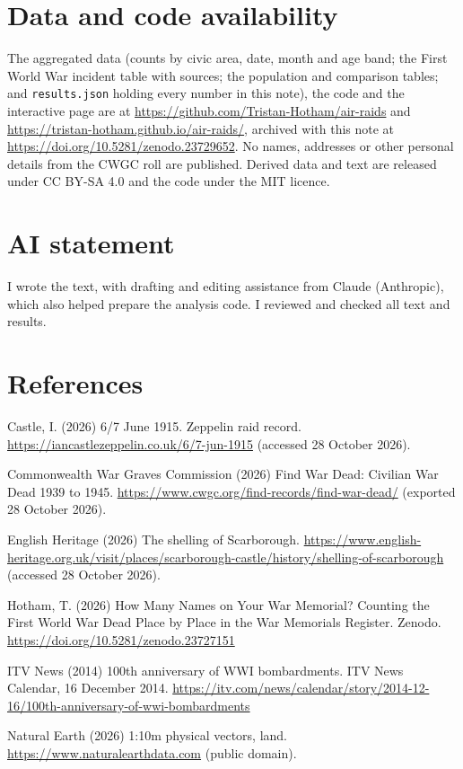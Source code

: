 \documentclass[11pt,a4paper]{article}
\begin{document}
\section*{Data and code availability}

The aggregated data (counts by civic area, date, month and age band; the First World War incident table with sources; the population and comparison tables; and \texttt{results.json} holding every number in this note), the code and the interactive page are at \url{https://github.com/Tristan-Hotham/air-raids} and \url{https://tristan-hotham.github.io/air-raids/}, archived with this note at \url{https://doi.org/10.5281/zenodo.23729652}. No names, addresses or other personal details from the CWGC roll are published. Derived data and text are released under CC BY-SA 4.0 and the code under the MIT licence.

\section*{AI statement}

I wrote the text, with drafting and editing assistance from Claude (Anthropic), which also helped prepare the analysis code. I reviewed and checked all text and results.

\section*{References}
\small
Castle, I. (2026) 6/7 June 1915. Zeppelin raid record. \url{https://iancastlezeppelin.co.uk/6/7-jun-1915} (accessed 28 October 2026).

Commonwealth War Graves Commission (2026) Find War Dead: Civilian War Dead 1939 to 1945. \url{https://www.cwgc.org/find-records/find-war-dead/} (exported 28 October 2026).

English Heritage (2026) The shelling of Scarborough. \url{https://www.english-heritage.org.uk/visit/places/scarborough-castle/history/shelling-of-scarborough} (accessed 28 October 2026).

Hotham, T. (2026) How Many Names on Your War Memorial? Counting the First World War Dead Place by Place in the War Memorials Register. Zenodo. \url{https://doi.org/10.5281/zenodo.23727151}

ITV News (2014) 100th anniversary of WWI bombardments. ITV News Calendar, 16 December 2014. \url{https://itv.com/news/calendar/story/2014-12-16/100th-anniversary-of-wwi-bombardments}

Natural Earth (2026) 1:10m physical vectors, land. \url{https://www.naturalearthdata.com} (public domain).
\end{document}
